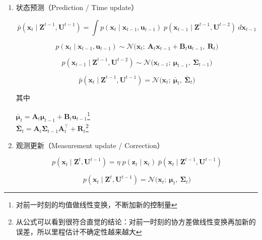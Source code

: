 \documentclass[../main.tex]{subfiles}
\begin{document}
\begin{enumerate}
{{\begin{enumerate}
  其中\\
  \begin{flushleft}
  $ \mathbf{C}_t\ \text{为}\ k\times n\ \text{维矩阵，且}\ k\ \text{为观测向量}\ \mathbf{z}_t\ \text{的维度}$\\
  $ \boldsymbol{\omega}_t\sim\mathcal{N}(\mathbf{0},\mathbf{Q}_t)$
  \end{flushleft}
则有：
  $$p(\mathbf{z}_t\mid \mathbf{x}_t)=\mathcal{N}\big(\mathbf{z}_t;\ \mathbf{C}_t\mathbf{x}_t,\ \mathbf{Q}_t\big)$$

  \item 状态预测（Prediction / Time update）
  
  $$\bar{p}(\mathbf{x}_t\mid \mathbf{Z}^{t-1},\mathbf{U}^{t-1})=\int p(\mathbf{x}_t\mid \mathbf{x}_{t-1},\mathbf{u}_{t-1})\;p(\mathbf{x}_{t-1}\mid \mathbf{Z}^{t-1},\mathbf{U}^{t-2})\ d\mathbf{x}_{t-1}$$
  
  $$p(\mathbf{x}_t\mid \mathbf{x}_{t-1},\mathbf{u}_{t-1})\sim\mathcal{N}\big(\mathbf{x}_t;\ \mathbf{A}_t\mathbf{x}_{t-1}+\mathbf{B}_t\mathbf{u}_{t-1},\ \mathbf{R}_t\big)$$
  
  $$p(\mathbf{x}_{t-1}\mid \mathbf{Z}^{t-1},\mathbf{U}^{t-2})\sim\mathcal{N}\big(\mathbf{x}_{t-1};\ \boldsymbol{\mu}_{t-1},\ \boldsymbol{\Sigma}_{t-1}\big)$$
  
  $$\bar{p}(\mathbf{x}_t\mid \mathbf{Z}^{t-1},\mathbf{U}^{t-1})=\mathcal{N}\big(\mathbf{x}_t;\ \bar{\boldsymbol{\mu}}_t,\ \bar{\boldsymbol{\Sigma}}_t\big)$$
  
  其中
  \begin{flushleft}
  $ \bar{\boldsymbol{\mu}}_t = \mathbf{A}_t\boldsymbol{\mu}_{t-1} + \mathbf{B}_t\mathbf{u}_{t-1}$\footnote{对前一时刻的均值做线性变换，不断加新的控制量}\\
  $ \bar{\boldsymbol{\Sigma}}_t = \mathbf{A}_t\boldsymbol{\Sigma}_{t-1}\mathbf{A}_t^\top + \mathbf{R}_t$\footnote{从公式可以看到很符合直觉的结论：对前一时刻的协方差做线性变换再加新的误差，所以里程估计不确定性越来越大}
  \end{flushleft}

  \item 观测更新（Measurement update / Correction）
  
  $$p(\mathbf{x}_t\mid \mathbf{Z}^t,\mathbf{U}^{t-1})=\eta\;p(\mathbf{z}_t\mid \mathbf{x}_t)\;\bar{p}(\mathbf{x}_t\mid \mathbf{Z}^{t-1},\mathbf{U}^{t-1})$$
  
  $$p(\mathbf{x}_t\mid \mathbf{Z}^t,\mathbf{U}^{t-1})=\mathcal{N}\big(\mathbf{x}_t;\ \boldsymbol{\mu}_t,\ \boldsymbol{\Sigma}_t\big)$$
  

\end{enumerate}}}
\end{enumerate}
\end{document}
